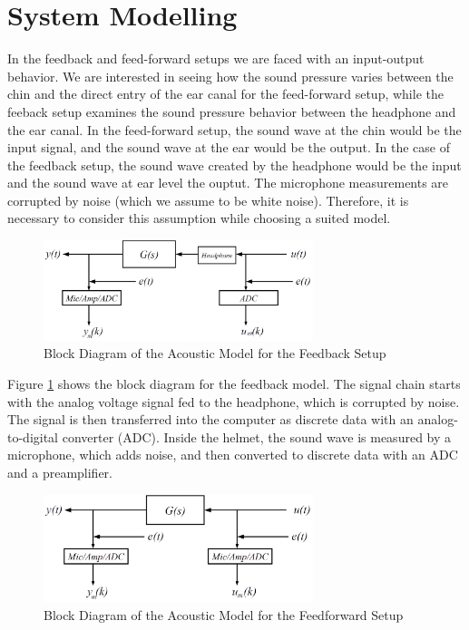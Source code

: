 \section{System Modelling}\label{sec: sysmod}

In the feedback and feed-forward setups we are faced with an input-output behavior. We are interested in seeing how the sound pressure varies between the chin and the direct entry of the ear canal for the feed-forward setup, while the feeback setup examines the sound pressure behavior between the headphone and the ear canal. In the feed-forward setup, the sound wave at the chin would be the input signal, and the sound wave at the ear would be the output. In the case of the feedback setup, the sound wave created by the headphone would be the input and the sound wave at ear level the ouptut. The microphone measurements are corrupted by noise (which we assume to be white noise). Therefore, it is necessary to consider this assumption while choosing a suited model.\\

\begin{figure}[h]
\centering
\includegraphics[width=0.7\textwidth]{pics/modelfb}
\caption{Block Diagram of the Acoustic Model for the Feedback Setup}
\label{fig:modelfb}
\end{figure}

Figure \ref{fig:modelfb} shows the block diagram for the feedback model. The signal chain starts with the analog voltage signal fed to the headphone, which is corrupted by noise. The signal is then transferred into the computer as discrete data with an analog-to-digital converter (ADC). Inside the helmet, the sound wave is measured by a microphone, which adds noise, and then converted to discrete data with an ADC and a preamplifier. \\

\begin{figure}[h]
\centering
\includegraphics[width=0.7\textwidth]{pics/modelff}
\caption{Block Diagram of the Acoustic Model for the Feedforward Setup}
\label{fig:modelff}
\end{figure}


